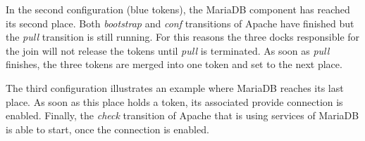 In the second configuration (blue tokens), the MariaDB component has reached
its second place. Both \emph{bootstrap} and \emph{conf} transitions of Apache
have finished but the \emph{pull} transition is still running. For this
reasons the three docks responsible for the join will not release the
tokens until \emph{pull} is terminated. As soon as \emph{pull}
finishes, the three tokens are merged into one token and set to the
next place.%

The third configuration illustrates an example where MariaDB reaches
its last place. As soon as this place holds a token, its associated
provide connection is enabled. Finally, the \emph{check}
transition of Apache that is using services of MariaDB is able to
start, once the connection is enabled.
